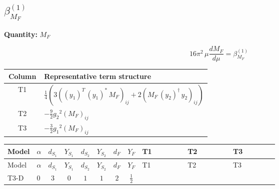 \documentclass[8pt]{article}
\begin{document}
\begin{landscape}
\section*{$\beta_{M_F}^{(1)}$}
\noindent\textbf{Quantity: }$M_F$\par\smallskip
\[16\pi^2\,\mu\frac{d M_F}{d\mu}=\beta_{M_F}^{(1)}\]
\begin{center}
\begin{tabular}{@{}c >{\raggedright\arraybackslash}p{0.82\linewidth}@{}}
\toprule
Column & Representative term structure \\
\midrule
T1 & \(\displaystyle \frac{1}{4} (3 \left(\left({y_1}\right)^{T}\,\left({y_1}\right)^{*}\,{M_F}\right)_{ij}+2 \left({M_F}\,\left({y_2}\right)^{\dagger}\,{y_2}\right)_{ij})\) \\
\midrule
T2 & \(\displaystyle -\frac{9}{2} {g_2}^2 \left({M_F}\right)_{ij}\) \\
\midrule
T3 & \(\displaystyle -\frac{3}{2} {g_1}^2 \left({M_F}\right)_{ij}\) \\
\midrule
\bottomrule
\end{tabular}
\end{center}
\smallskip
\tiny
\begin{longtable}{@{}llcccccc >{\raggedright\arraybackslash}p{0.21\linewidth} >{\raggedright\arraybackslash}p{0.21\linewidth} >{\raggedright\arraybackslash}p{0.21\linewidth}@{}}
\toprule
Model & $\alpha$ & $d_{S_1}$ & $Y_{S_1}$ & $d_{S_2}$ & $Y_{S_2}$ & $d_F$ & $Y_F$ & T1 & T2 & T3 \\
\midrule
\endfirsthead
\toprule
Model & $\alpha$ & $d_{S_1}$ & $Y_{S_1}$ & $d_{S_2}$ & $Y_{S_2}$ & $d_F$ & $Y_F$ & T1 & T2 & T3 \\
\midrule
\endhead
T3-D & $0$ & $3$ & $0$ & $1$ & $1$ & $2$ & $\frac{1}{2}$ & \scriptsize\adjustbox{max width=\linewidth}{$\begin{gathered} \frac{1}{4} (3 \left(\left({y_1}\right)^{T}\,\left({y_1}\right)^{*}\,{M_F}\right)_{ij}+2 \left({M_F}\,\left({y_2}\right)^{\dagger}\,{y_2}\right)_{ij})\end{gathered}$} & \scriptsize\adjustbox{max width=\linewidth}{$\begin{gathered} -\frac{9}{2} {g_2}^2 \left({M_F}\right)_{ij}\end{gathered}$} & \scriptsize\adjustbox{max width=\linewidth}{$\begin{gathered} -\frac{3}{2} {g_1}^2 \left({M_F}\right)_{ij}\end{gathered}$} \\
\midrule
\bottomrule
\end{longtable}
\clearpage

\end{landscape}
\end{document}
